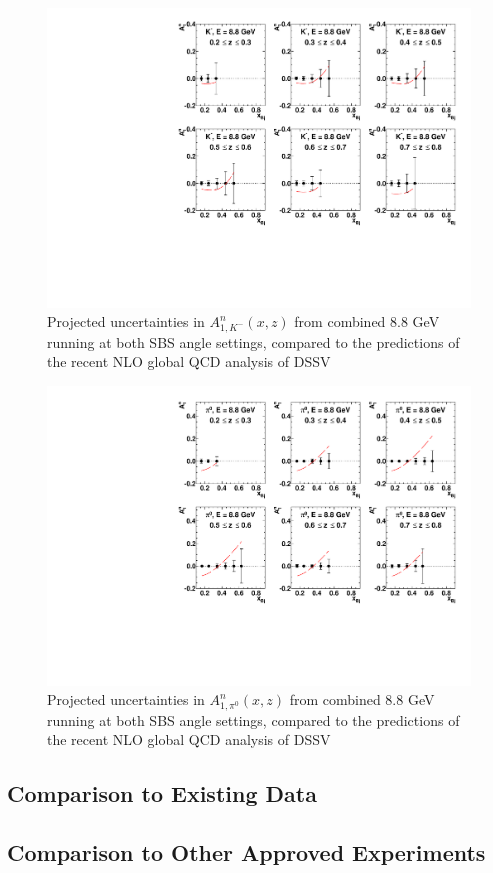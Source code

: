 \begin{figure}[h]
  \begin{center}
    \includegraphics[width=.75\textwidth]{figures/A1n_vs_x_E88_km.pdf}
  \end{center}
  \caption{\label{A1n_km_88gev} Projected uncertainties in $A_{1,K^-}^{n}(x,z)$ from combined 8.8 GeV running at both SBS angle settings, compared to the predictions of the recent NLO global QCD analysis of DSSV~\cite{DSSVplus}}
\end{figure}

\begin{figure}[h]
  \begin{center}
    \includegraphics[width=.75\textwidth]{figures/A1n_vs_x_E88_pi0.pdf}
  \end{center}
  \caption{\label{A1n_pi0_88gev} Projected uncertainties in $A_{1,\pi^0}^{n}(x,z)$ from combined 8.8 GeV running at both SBS angle settings, compared to the predictions of the recent NLO global QCD analysis of DSSV~\cite{DSSVplus}}
\end{figure}

\subsection{Comparison to Existing Data}

\subsection{Comparison to Other Approved Experiments}

